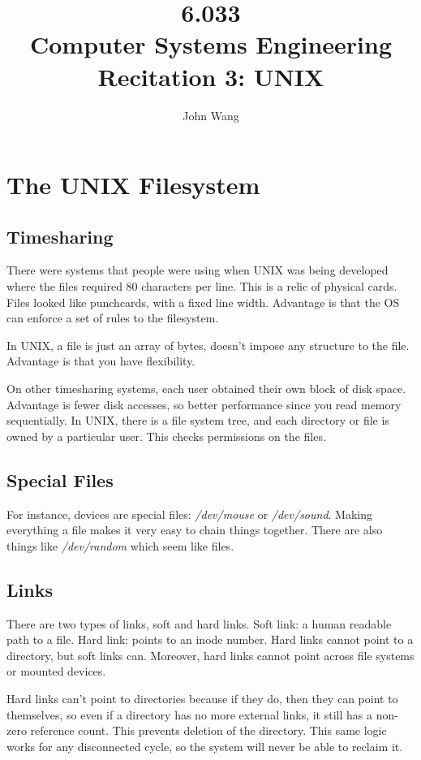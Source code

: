 \documentclass[psamsfonts]{amsart}
\title{6.033 \\
Computer Systems Engineering \\
Recitation 3: UNIX}
\author{John Wang}
\begin{document}
\maketitle

\section{The UNIX Filesystem}

\subsection{Timesharing}

There were systems that people were using when UNIX was being developed where the files required 80 characters per line. This is a relic of physical cards. Files looked like punchcards, with a fixed line width. Advantage is that the OS can enforce a set of rules to the filesystem.

In UNIX, a file is just an array of bytes, doesn't impose any structure to the file. Advantage is that you have flexibility.

On other timesharing systems, each user obtained their own block of disk space. Advantage is fewer disk accesses, so better performance since you read memory sequentially. In UNIX, there is a file system tree, and each directory or file is owned by a particular user. This checks permissions on the files.

\subsection{Special Files}

For instance, devices are special files: \emph{/dev/mouse} or \emph{/dev/sound}. Making everything a file makes it very easy to chain things together. There are also things like \emph{/dev/random} which seem like files.

\subsection{Links}

There are two types of links, soft and hard links. Soft link: a human readable path to a file. Hard link: points to an inode number. Hard links cannot point to a directory, but soft links can. Moreover, hard links cannot point across file systems or mounted devices.

Hard links can't point to directories because if they do, then they can point to themselves, so even if a directory has no more external links, it still has a non-zero reference count. This prevents deletion of the directory. This same logic works for any disconnected cycle, so the system will never be able to reclaim it.
\end{document}
